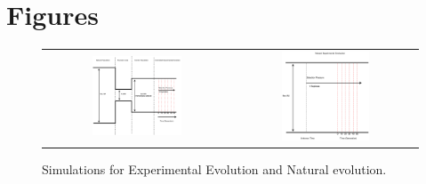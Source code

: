 \documentclass[11pt]{article}
\begin{document}
\section{Figures}
\begin{figure}[H]
	\centering
	\begin{tabular}{cc}
	\includegraphics[trim=0.1in 0 .08in 0.02in , clip,width=0.5\textwidth]{figures/ControlledExperimentalEvolution.pdf}
&	\includegraphics[trim=0.1in 0 .08in 0.02in , clip,width=0.5\textwidth]{figures/NaturalExperimentalEvolution.pdf}
	\end{tabular}
	\caption{ Simulations for Experimental Evolution and Natural
          evolution. } \label{fig:ee}
\end{figure}

\clearpage
\newpage
\end{document}
